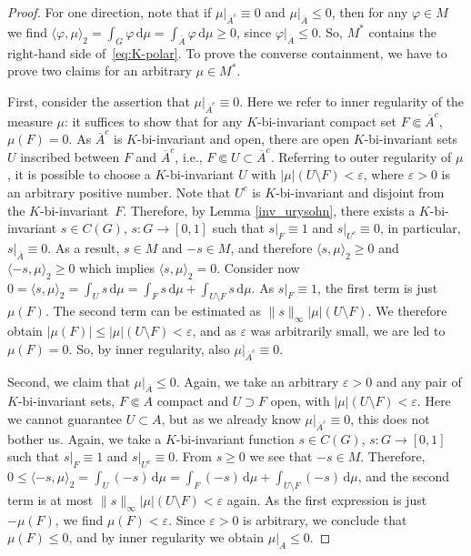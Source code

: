 \documentclass[[a4paper,english,12pt]{amsart}
\theoremstyle{plain}
\theoremstyle{remark}
\newcommand{\ff}{\varphi}
\newcommand{\ve}{\varepsilon}
\begin{document}
\begin{proof}
For one direction, note that if $\mu|_{\overline{A}^c}\equiv 0$ and $\mu|_{\overline{A}} \le 0$, then for any $\ff \in M$ we find $\langle \varphi, \mu \rangle_2 = \int_G \ff \,\mbox{d}\mu  = \int_{\overline{A}} \ff \,\mbox{d}\mu \ge 0$, since $\ff|_{\overline{A}}\le 0$. So, $M^*$ contains the right-hand side of~\eqref{eq:K-polar}. To prove the converse containment, we have to prove two claims for an arbitrary $\mu \in M^{*}$.

First, consider the assertion that $\mu|_{\overline{A}^c} \equiv 0$. Here we refer to inner regularity of the measure $\mu$: it suffices to show that for any $K$-bi-invariant compact set $F \Subset \overline{A}^c$, $\mu(F)=0$. As $\overline{A}^c$ is $K$-bi-invariant and open, there are open $K$-bi-invariant sets  $U$ inscribed between $F$ and $\overline{A}^c$, i.e., $F \Subset U \subset \overline{A}^c$. 
Referring to outer regularity of $\mu$, it is possible to choose a $K$-bi-invariant $U$ with $|\mu|(U\setminus F)<\ve$, where $\ve > 0$ is an arbitrary positive number. Note that $U^c$ is $K$-bi-invariant and disjoint from the $K$-bi-invariant~$F$. Therefore, by Lemma \ref{inv_urysohn}, there exists a $K$-bi-invariant $s \in C(G)$, $s : G \to [0,1]$ such that $s|_F\equiv 1$ and $s|_{U^c}\equiv 0$, in particular, $s|_{\overline{A}} \equiv 0$. As a result, $s \in M$ and $-s \in M$, and therefore $\langle s, \mu \rangle_2 \ge 0$ and $\langle -s, \mu \rangle_2 \ge 0$ which implies $\langle s, \mu \rangle_2 = 0$. Consider now $0 = \langle s, \mu \rangle_2 = \int_U s \,\mbox{d}\mu = \int_F s \,\mbox{d}\mu + \int_{U\setminus F} s \,\mbox{d}\mu$. As $s|_F \equiv 1$, the first term is just $\mu(F)$. The second term can be estimated as $\|s\|_\infty |\mu|(U\setminus F)$.  We therefore obtain $|\mu(F)| \le |\mu|(U\setminus F) <\ve$, and as $\ve$ was arbitrarily small, we are led to $\mu(F) = 0$. So, by inner regularity, also $\mu|_{\overline{A}^c} \equiv 0$.

Second, we claim that $\mu|_{\overline{A}} \le 0$. Again, we take an arbitrary $\ve > 0$ and any pair of $K$-bi-invariant sets, $F \Subset A$ compact and $U\supset F$ open, with $|\mu|(U\setminus F) < \ve$. Here we cannot guarantee $U \subset A$, but as we already know $\mu|_{\overline{A}^c}\equiv 0$, this does not bother us. Again, we take a $K$-bi-invariant function $s \in C(G)$, $s : G \to [0,1]$ such that $s|_F\equiv 1$ and $s|_{U^c}\equiv 0$. From $s \ge  0$ we see that $-s \in M$. Therefore, $0 \le \langle -s, \mu \rangle_2 = \int_U (-s) \,\mbox{d}\mu = \int_F (-s) \,\mbox{d}\mu + \int_{U\setminus F} (-s) \,\mbox{d}\mu$, and the second term is at most $\|s\|_\infty |\mu|(U\setminus F) < \ve$ again. As the first expression is just $-\mu(F)$, we find $\mu(F) < \ve$. Since $\ve >0$ is arbitrary, we conclude that $\mu(F)\le 0$, and by inner regularity we obtain $\mu|_A \le 0$.
\end{proof}
\end{document}
